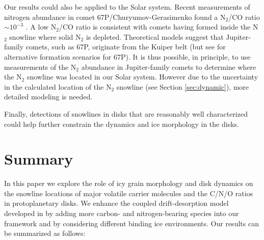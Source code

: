 \documentclass[apj]{emulateapj}
\begin{document}
Our results could also be applied to the Solar system. Recent measurements of nitrogen abundance in comet 67P/Churyumov-Gerasimenko found a N$_2$/CO ratio $\sim 10^{-3}$ \citep{rubin15}. A low N$_2$/CO ratio is consistent with comets having formed inside the N$_2$ snowline where solid N$_2$ is depleted. Theoretical models suggest that Jupiter-family comets, such as 67P, originate from the Kuiper belt \citep{duncan97} (but see \citealt{rubin15} for alternative formation scenarios for 67P). It is thus possible, in principle, to use measurements of the N$_2$ abundance in Jupiter-family comets to determine where the N$_2$ snowline was located in our Solar system. However due to the uncertainty in the calculated location of the N$_2$ snowline (see Section \ref{sec:dynamic}), more detailed modeling is needed. 

Finally, detections of snowlines in disks that are reasonably well characterized could help further constrain the dynamics and ice morphology in the disks.    


\section{Summary}
\label{sec:summary}

In this paper we explore the role of icy grain morphology and disk dynamics on the snowline locations of major volatile carrier molecules and the C/N/O ratios in protoplanetary disks. We enhance the coupled drift-desorption model developed in \citet{piso15b} by adding more carbon- and nitrogen-bearing species into our framework and by considering different binding ice environments. Our results can be summarized as follows:
\end{document}
